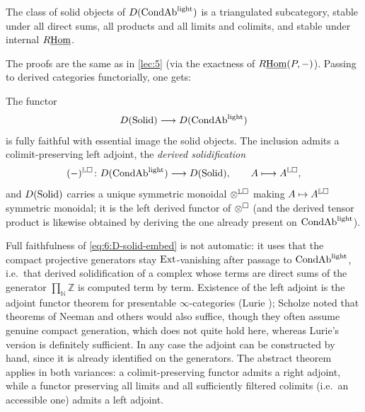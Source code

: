 \begin{corollary}
\label{cor:6:triangulated}
The class of solid objects of $D(\mathrm{CondAb}^{\mathrm{light}})$ is a triangulated subcategory, stable
under all direct sums, all products and all limits and colimits, and stable
under internal $R\underline{\operatorname{Hom}}$.
\end{corollary}

The proofs are the same as in \cref{lec:5} (via the exactness of
$R\underline{\operatorname{Hom}}(P,-)$). Passing to derived categories functorially, one gets:

\begin{proposition}
\label{prop:6:derived-solidification}
The functor
\begin{equation}
\label{eq:6:D-solid-embed}
D(\mathrm{Solid})\longrightarrow D(\mathrm{CondAb}^{\mathrm{light}})
\end{equation}
is fully faithful with essential image the solid objects. The inclusion admits a
colimit-preserving left adjoint, the \emph{derived solidification}
\begin{equation*}
(-)^{\mathbb{L}\square}\colon D(\mathrm{CondAb}^{\mathrm{light}})\longrightarrow D(\mathrm{Solid}),\qquad
A\longmapsto A^{\mathbb{L}\square},
\end{equation*}
and $D(\mathrm{Solid})$ carries a unique symmetric monoidal
$\otimes^{\mathbb{L}\square}$ making $A\mapsto A^{\mathbb{L}\square}$ symmetric
monoidal; it is the left derived functor of $\otimes^{\square}$ (and the derived
tensor product is likewise obtained by deriving the one already present on
$\mathrm{CondAb}^{\mathrm{light}}$).
\end{proposition}

\begin{remark}
\label{rmk:6:adjoint-existence}
Full faithfulness of \eqref{eq:6:D-solid-embed} is not automatic: it uses that
the compact projective generators stay $\operatorname{Ext}$-vanishing after passage to
$\mathrm{CondAb}^{\mathrm{light}}$, i.e.\ that derived solidification of a complex whose terms are direct
sums of the generator $\prod_{\mathbb{N}}\mathbb{Z}$ is computed term by term.
Existence of the left adjoint is the adjoint functor theorem for presentable
$\infty$-categories (Lurie \cite{lurie2017higher}); Scholze noted that theorems
of Neeman and others would also suffice, though they often assume genuine
compact generation, which does not quite hold here, whereas Lurie's version is
definitely sufficient. In any case the adjoint can be constructed by hand, since
it is already identified on the generators. The abstract theorem applies in both
variances: a colimit-preserving functor admits a right adjoint, while a functor
preserving all limits and all sufficiently filtered colimits (i.e.\ an accessible
one) admits a left adjoint.
\end{remark}


